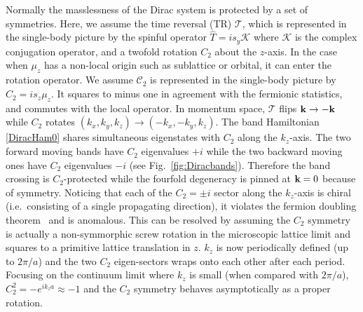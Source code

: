 Normally the masslessness of the Dirac system is protected by a set of symmetries. Here, we assume the time reversal (TR) $\mathcal{T}$, which is represented in the single-body picture by the spinful operator $\hat{T}=is_y\mathcal{K}$ where $\mathcal{K}$ is the complex conjugation operator, and a twofold rotation $C_2$ about the $z$-axis. In the case when $\mu_z$ has a non-local origin such as sublattice or orbital, it can enter the rotation operator. We assume $\mathcal{C}_2$ is represented in the single-body picture by $\hat{C}_2=is_z\mu_z$. It squares to minus one in agreement with the fermionic statistics, and commutes with the local \TR operator. In momentum space, $\mathcal{T}$ flips ${\bf k}\to-{\bf k}$ while $C_2$ rotates $(k_x,k_y,k_z)\to(-k_x,-k_y,k_z)$. The band Hamiltonian \eqref{DiracHam0} shares simultaneous eigenstates with $C_2$ along the $k_z$-axis. The two forward moving bands have $C_2$ eigenvalues $+i$ while the two backward moving ones have $C_2$ eigenvalues $-i$ (see Fig.~\ref{fig:Diracbands}). Therefore the band crossing is $C_2$-protected while the fourfold degeneracy is pinned at ${\bf k}=0$ because of \TR symmetry. Noticing that each of the $C_2=\pm i$ sector along the $k_z$-axis is chiral (i.e.~consisting of a single propagating direction), it violates the fermion doubling theorem~\cite{Nielsen_Ninomiya_1981,NielsenNinomiyaPLB1981} and is anomalous. This can be resolved by assuming the $C_2$ symmetry is actually a non-symmorphic screw rotation in the microscopic lattice limit and squares to a primitive lattice translation in $z$. $k_z$ is now periodically defined (up to $2\pi/a$) and the two $C_2$ eigen-sectors wraps onto each other after each period. Focusing on the continuum limit where $k_z$ is small (when compared with $2\pi/a$), $C_2^2=-e^{ik_za}\approx-1$ and the $C_2$ symmetry behaves asymptotically as a proper rotation.

